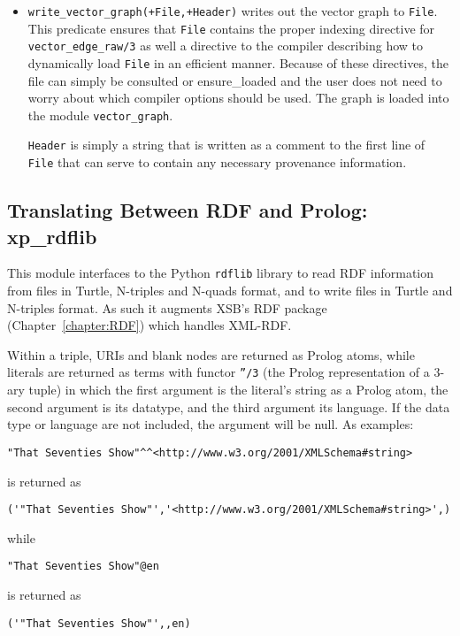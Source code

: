 \begin{itemize}
\item {\tt write\_vector\_graph(+File,+Header)} writes out the vector
  graph to {\tt File}.  This predicate ensures that {\tt File}
  contains the proper indexing directive for {\tt vector\_edge\_raw/3}
  as well a directive to the compiler describing how to dynamically
  load {\tt File} in an efficient manner.  Because of these
  directives, the file can simply be consulted or ensure\_loaded and
  the user does not need to worry about which compiler options should
  be used.  The graph is loaded into the module {\tt vector\_graph}.

  {\tt Header} is simply a string that is written as a comment to the
  first line of {\tt File} that can serve to contain any necessary
  provenance information.
\end{itemize}  

\subsection{Translating Between RDF and Prolog: xp\_rdflib} \label{secLxp-rdflib}
This module interfaces to the Python {\tt rdflib} library to read RDF
information from files in Turtle, N-triples and N-quads format, and to
write files in Turtle and N-triples format.  As such it augments XSB's
RDF package (Chapter~\ref{chapter:RDF}) which handles
XML-RDF.

Within a triple, URIs and blank nodes are returned as Prolog atoms,
while literals are returned as terms with functor {\tt ''/3} (the
Prolog representation of a 3-ary tuple) in which the first argument is
the literal's string as a Prolog atom, the second argument is its
datatype, and the third argument its language. If the data type or
language are not included, the argument will be null.  As examples:

\begin{verbatim}
"That Seventies Show"^^<http://www.w3.org/2001/XMLSchema#string> 
\end{verbatim}
is returned as 
\begin{verbatim}
('"That Seventies Show"','<http://www.w3.org/2001/XMLSchema#string>',) 
\end{verbatim}
while 
\begin{verbatim}
"That Seventies Show"@en
\end{verbatim}
is returned as
\begin{verbatim}
('"That Seventies Show"',,en) 
\end{verbatim}

